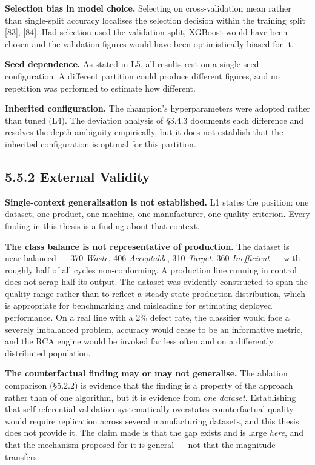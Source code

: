 \textbf{Selection bias in model choice.} Selecting on cross-validation mean rather than single-split accuracy localises the selection decision within the training split {[}83{]}, {[}84{]}. Had selection used the validation split, XGBoost would have been chosen and the validation figures would have been optimistically biased for it.

\textbf{Seed dependence.} As stated in L5, all results rest on a single seed configuration. A different partition could produce different figures, and no repetition was performed to estimate how different.

\textbf{Inherited configuration.} The champion's hyperparameters were adopted rather than tuned (L4). The deviation analysis of §3.4.3 documents each difference and resolves the depth ambiguity empirically, but it does not establish that the inherited configuration is optimal for this partition.

\hypertarget{external-validity}{%
\subsection{5.5.2 External Validity}\label{external-validity}}

\textbf{Single-context generalisation is not established.} L1 states the position: one dataset, one product, one machine, one manufacturer, one quality criterion. Every finding in this thesis is a finding about that context.

\textbf{The class balance is not representative of production.} The dataset is near-balanced --- 370 \emph{Waste}, 406 \emph{Acceptable}, 310 \emph{Target}, 360 \emph{Inefficient} --- with roughly half of all cycles non-conforming. A production line running in control does not scrap half its output. The dataset was evidently constructed to span the quality range rather than to reflect a steady-state production distribution, which is appropriate for benchmarking and misleading for estimating deployed performance. On a real line with a 2\% defect rate, the classifier would face a severely imbalanced problem, accuracy would cease to be an informative metric, and the RCA engine would be invoked far less often and on a differently distributed population.

\textbf{The counterfactual finding may or may not generalise.} The ablation comparison (§5.2.2) is evidence that the finding is a property of the approach rather than of one algorithm, but it is evidence from \emph{one dataset}. Establishing that self-referential validation systematically overstates counterfactual quality would require replication across several manufacturing datasets, and this thesis does not provide it. The claim made is that the gap exists and is large \emph{here}, and that the mechanism proposed for it is general --- not that the magnitude transfers.

